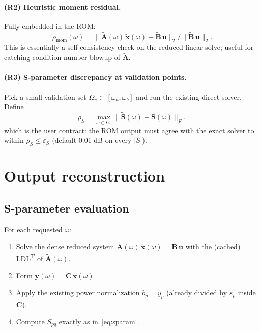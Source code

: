 \documentclass[11pt,a4paper]{article}
\begin{document}
\paragraph{(R2) Heuristic moment residual.} Fully embedded in the ROM:
\begin{equation}
  \rho_{\mathrm{mom}}(\omega) =
  \|\widetilde{\bm A}(\omega)\,\widetilde{\bm x}(\omega) - \widetilde{\bm B}\,\bm u\|_2
  / \|\widetilde{\bm B}\,\bm u\|_2.
\end{equation}
This is essentially a self-consistency check on the reduced linear solve;
useful for catching condition-number blowup of $\widetilde{\bm A}$.

\paragraph{(R3) S-parameter discrepancy at validation points.}
Pick a small validation set $\Omega_v\subset[\omega_a,\omega_b]$ and run the
existing direct solver. Define
\begin{equation}
  \rho_S = \max_{\omega\in\Omega_v} \big\|\widetilde{\bm S}(\omega)-\bm S(\omega)\big\|_F,
\end{equation}
which is the user contract: the ROM output must agree with the exact
solver to within $\rho_S \le \varepsilon_S$ (default 0.01 dB on every
$|S|$).

\section{Output reconstruction}

\subsection{S-parameter evaluation}

For each requested $\omega$:
\begin{enumerate}
  \item Solve the dense reduced system
        $\widetilde{\bm A}(\omega)\,\widetilde{\bm x}(\omega) = \widetilde{\bm B}\,\bm u$
        with the (cached) LDL\textsuperscript{T} of $\widetilde{\bm A}(\omega)$.
  \item Form $\bm y(\omega) = \widetilde{\bm C}\,\widetilde{\bm x}(\omega)$.
  \item Apply the existing power normalization
        $b_p = y_p$ (already divided by $s_p$ inside $\widetilde{\bm C}$).
  \item Compute $S_{pq}$ exactly as in~\eqref{eq:sparam}.
\end{enumerate}
\end{document}
